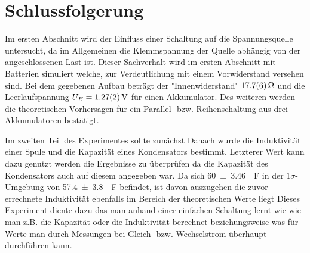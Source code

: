 
\section{Schlussfolgerung}


Im ersten Abschnitt wird der Einfluss einer Schaltung auf die Spannungsquelle untersucht, da im Allgemeinen die Klemmspannung der Quelle abhängig von der angeschlossenen Last ist. Dieser Sachverhalt wird im ersten Abschnitt mit Batterien simuliert welche, zur Verdeutlichung mit einem Vorwiderstand versehen sind. Bei dem gegebenen Aufbau beträgt der "Innenwiderstand" $\SI{17.7+-0.6}{\ohm}$ und die Leerlaufspannung $U_E=\SI{1.27+-0.02}{V}$ für einen Akkumulator. Des weiteren werden die theoretischen Vorhersagen für ein Parallel- bzw. Reihenschaltung aus drei Akkumulatoren bestätigt.

Im zweiten Teil des Experimentes sollte zunächst %
Danach wurde die Induktivität einer Spule und die Kapazität eines Kondensators bestimmt.
Letzterer Wert kann dazu genutzt werden die Ergebnisse zu überprüfen da die Kapazität des Kondensators auch auf diesem angegeben war.
Da sich \SI{60+-3.46}{\mu F} in der $1\sigma$-Umgebung von \SI{57.4+-3.8}{\mu F} befindet, ist davon auszugehen die zuvor errechnete Induktivität ebenfalls im Bereich der theoretischen Werte liegt
Dieses Experiment diente dazu das man anhand einer einfachen Schaltung lernt wie wie man z.B. die Kapazität oder die Induktivität berechnet beziehungsweise was für Werte man durch Messungen bei Gleich- bzw. Wechselstrom überhaupt durchführen kann.










